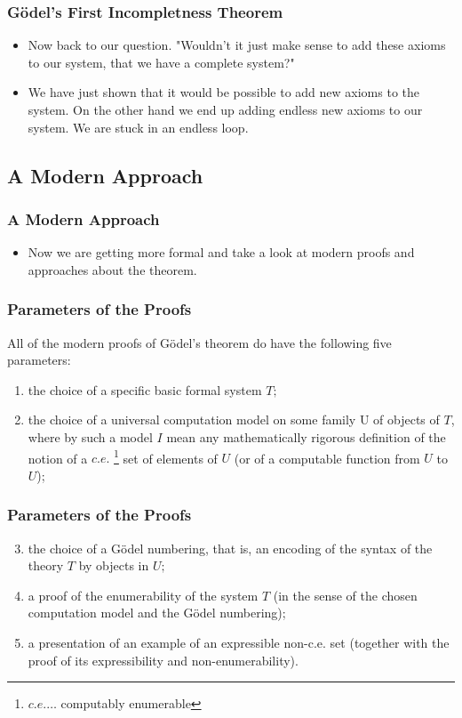 \documentclass[aspectratio=169]{beamer}
\begin{document}
\begin{frame}
	\frametitle{Gödel's First Incompletness Theorem}
	\begin{itemize}
		\item Now back to our question. "Wouldn't it just make sense to add these axioms to our system, that we have a complete system?"
		\item We have just shown that it would be possible to add new axioms to the system. On the other hand we end up adding endless new axioms to our system. We are stuck in an endless loop.
	\end{itemize}
\end{frame}

\subsection{A Modern Approach}
\begin{frame}
	\frametitle{A Modern Approach}
	\begin{itemize}
		\item Now we are getting more formal and take a look at modern proofs and approaches about the theorem.
	\end{itemize}
\end{frame}

\begin{frame}
	\frametitle{Parameters of the Proofs}
	All of the modern proofs of Gödel's theorem do have the following five parameters: \\ \vspace{0.5cm}
	\begin{enumerate}
		\item the choice of a specific basic formal system $T;$
		\item the choice of a universal computation model on some family U of objects of $T$, where by such a model $I$ mean any mathematically rigorous definition of the notion of a $c.e.$ \footnote[frame]{$c.e. \ldots $ computably enumerable} set of elements of $U$ (or of a computable function from $U$ to $U$);
	\end{enumerate}
\end{frame}

\begin{frame}
	\frametitle{Parameters of the Proofs}
	\begin{enumerate}
	\setcounter{enumi}{2}
		\item the choice of a Gödel numbering, that is, an encoding of the syntax of the theory $T$ by objects in $U;$
		\item a proof of the enumerability of the system $T$ (in the sense of the chosen computation model and the Gödel numbering);
		\item a presentation of an example of an expressible non-c.e. set (together with the proof of its expressibility and non-enumerability).
	\end{enumerate}
	\begin{flushright}
		\cite{bekl}
	\end{flushright}
\end{frame}
\end{document}
